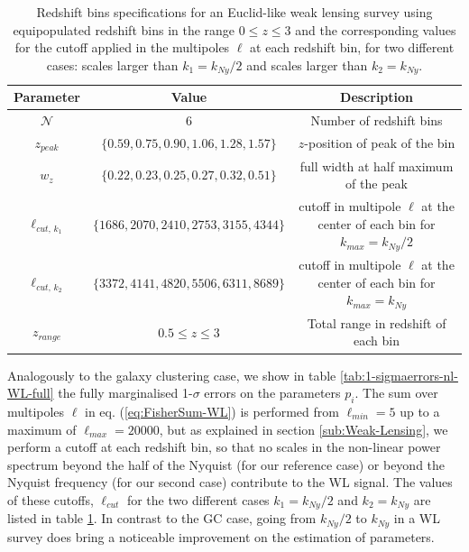 \begin{table}
\centering{}%
\begin{tabular}{|c|c|c|}
\hline 
\textbf{Parameter}  & \textbf{Value}  & \textbf{Description}\tabularnewline
\hline 
$\mathcal{N}$  & 6  & Number of redshift bins\tabularnewline
$z_{peak}$  & $\{0.59,0.75,0.90,1.06,1.28,1.57\}$  & $z$-position of peak of the bin\tabularnewline
$w_{z}$  & $\{0.22,0.23,0.25,0.27,0.32,0.51\}$  & full width at half maximum of the peak\tabularnewline
$\ell_{cut,\, k_{1}}$  & $\{1686,2070,2410,2753,3155,4344\}$  & cutoff in multipole $\ell$ at the center of each bin for $k_{max}=k_{Ny}/2$\tabularnewline
$\ell_{cut,\, k_{2}}$  & $\{3372,4141,4820,5506,6311,8689\}$  & cutoff in multipole $\ell$ at the center of each bin for $k_{max}=k_{Ny}$\tabularnewline
$z_{range}$  & $0.5\leq z\leq3$  & Total range in redshift of each bin\tabularnewline
\hline 
\end{tabular}
\caption[Redshift bin specifications for a Euclid WL Fisher forecast]{\label{tab:WL-zbins-specs} Redshift bins specifications for an Euclid-like
weak lensing survey using equipopulated redshift bins in the range
$0\leq z\leq3$ and the corresponding values for the cutoff applied
in the multipoles $\ell$ at each redshift bin, for two different
cases: scales larger than $k_{1}=k_{Ny}/2$ and scales larger than
$k_{2}=k_{Ny}$.}
\end{table}


Analogously to the galaxy clustering case, we show in table \ref{tab:1-sigmaerrors-nl-WL-full}
the fully marginalised 1-$\sigma$ errors on the parameters $p_{i}$.
The sum over multipoles $\ell$ in eq. (\ref{eq:FisherSum-WL}) is
performed from $\ell_{min}=5$ up to a maximum of $\ell_{max}=20000$,
but as explained in section \ref{sub:Weak-Lensing}, we perform a
cutoff at each redshift bin, so that no scales in the non-linear power
spectrum beyond the half of the Nyquist (for our reference case) or
beyond the Nyquist frequency (for our second case) contribute to the
WL signal. The values of these cutoffs, $\ell_{cut}$ for the two
different cases $k_{1}=k_{Ny}/2$ and $k_{2}=k_{Ny}$ are listed in
table \ref{tab:WL-zbins-specs}. In contrast to the GC case, going
from $k_{Ny}/2$ to $k_{Ny}$ in a WL survey does bring a noticeable
improvement on the estimation of parameters.

